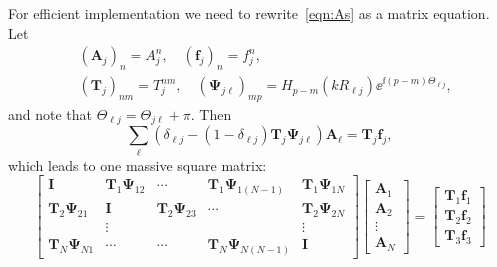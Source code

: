 \documentclass[ 12pt, a4paper]{article}
\renewcommand{\vec}[1]{\boldsymbol{#1}}
\begin{document}
For efficient implementation we need to rewrite~\eqref{eqn:As} as a matrix equation. Let
\begin{align}
  &(\vec A_j)_n =  A_j^n, \quad (\vec f_j)_n =  f_j^n,
  \\
  &(\vec T_j)_{nm} = T^{nm}_j, \quad (\vec \Psi_{j \ell})_{mp} =  H_{p-m}(k R_{\ell j})\ee^{\ii(p-m)\Theta_{\ell j}},
\end{align}
and note that $\Theta_{\ell j} = \Theta_{j \ell } + \pi$. Then
\begin{equation}
 \sum_{\ell}(\delta_{\ell j} -  (1 -\delta_{\ell j}) \vec T_j \vec \Psi_{j \ell}) \vec A_\ell  = \vec T_j \vec f_j,
\end{equation}
which leads to one massive square matrix:
\begin{equation}
  \begin{bmatrix}
    \vec I & \vec T_1 \vec \Psi_{1 2} & \cdots & \vec T_1 \vec \Psi_{1 (N-1)} & \vec T_1 \vec \Psi_{1 N} \\
    \vec T_2 \vec \Psi_{2 1} & \vec I &  \vec T_2 \vec \Psi_{2 3} & \cdots & \vec T_2 \vec \Psi_{2 N} \\
     & \vdots & & & \vdots \\
     \vec T_N \vec \Psi_{N 1}  & \cdots & \cdots & \vec T_N \vec \Psi_{N (N-1)} & \vec I
  \end{bmatrix}
  \begin{bmatrix}
    \vec A_1 \\
    \vec A_2 \\
    \vdots \\
    \vec A_N
  \end{bmatrix}
   = \begin{bmatrix}
     \vec T_1 \vec f_1 \\
     \vec T_2 \vec f_2 \\
     \vec T_3 \vec f_3
   \end{bmatrix}
\end{equation}

\printbibliography
\end{document}
